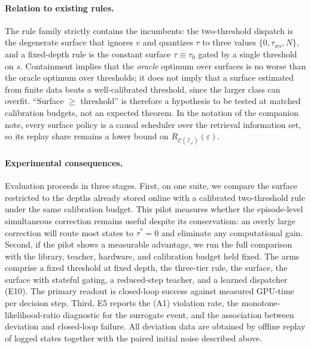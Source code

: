 \documentclass{article}
\begin{document}
\paragraph{Relation to existing rules.}
The rule family strictly contains the incumbents: the two-threshold dispatch
is the degenerate surface that ignores $v$ and quantizes $\tau$ to three
values $\{0, \tau_{ws}, N\}$, and a fixed-depth rule is the constant surface
$\tau \equiv \tau_0$ gated by a single threshold on $s$. Containment implies
that the \emph{oracle} optimum over surfaces is no worse than the oracle
optimum over thresholds; it does not imply that a surface estimated from
finite data beats a well-calibrated threshold, since the larger class can
overfit. ``Surface $\ge$ threshold'' is therefore a hypothesis to be tested
at matched calibration budgets, not an expected theorem. In the notation of
the companion note, every surface policy is a causal scheduler over the
retrieval information set, so its replay share remains a lower bound on
$R_{\mathcal{C}(\mathcal{I}_\varphi)}(\varepsilon)$.

\paragraph{Experimental consequences.}
Evaluation proceeds in three stages. First, on one suite, we compare the
surface restricted to the depths already stored online with a calibrated
two-threshold rule under the same calibration budget. This pilot measures
whether the episode-level simultaneous correction remains useful despite its
conservatism: an overly large correction will route most states to
$\tau^{*}=0$ and eliminate any computational gain. Second, if the pilot shows
a measurable advantage, we run the full comparison with the library, teacher,
hardware, and calibration budget held fixed. The arms comprise a fixed
threshold at fixed depth, the three-tier rule, the surface, the surface with
stateful gating, a reduced-step teacher, and a learned dispatcher (E10). The
primary readout is closed-loop success against measured GPU-time per decision
step. Third, E5 reports the (A1) violation rate, the
monotone-likelihood-ratio diagnostic for the surrogate event, and the
association between deviation and closed-loop failure. All deviation data are
obtained by offline replay of logged states together with the paired initial
noise described above.
\end{document}

